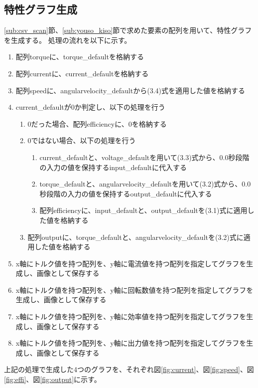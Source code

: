 \subsection{特性グラフ生成}\label{sub:toku_gurahu}
\ref{sub:csv_scan}節、\ref{sub:youso_kiso}節で求めた要素の配列を用いて、特性グラフを生成する。
処理の流れを以下に示す。
\begin{enumerate}
    \item 配列torqueに、torque\_defaultを格納する
    \item 配列currentに、current\_defaultを格納する
    \item 配列speedに、angularvelocity\_defaultから(3.4)式を適用した値を格納する
    \item current\_defaultが0か判定し、以下の処理を行う
    \begin{enumerate}
        \item 0だった場合、配列efficiencyに、0を格納する
        \item 0ではない場合、以下の処理を行う
        \begin{enumerate}
            \item current\_defaultと、voltage\_defaultを用いて(3.3)式から、0.0秒段階の入力の値を保持するinput\_defaultに代入する
            \item torque\_defaultと、angularvelocity\_defaultを用いて(3.2)式から、0.0秒段階の入力の値を保持するoutput\_defaultに代入する
            \item 配列efficiencyに、input\_defaultと、output\_defaultを(3.1)式に適用した値を格納する
        \end{enumerate}
    \item 配列outputに、torque\_defaultと、angularvelocity\_defaultを(3.2)式に適用した値を格納する
    \end{enumerate}
    \item x軸にトルク値を持つ配列を、y軸に電流値を持つ配列を指定してグラフを生成し、画像として保存する
    \item x軸にトルク値を持つ配列を、y軸に回転数値を持つ配列を指定してグラフを生成し、画像として保存する
    \item x軸にトルク値を持つ配列を、y軸に効率値を持つ配列を指定してグラフを生成し、画像として保存する
    \item x軸にトルク値を持つ配列を、y軸に出力値を持つ配列を指定してグラフを生成し、画像として保存する
\end{enumerate}
上記の処理で生成した4つのグラフを、それぞれ図\ref{fig:current}、図\ref{fig:speed}、図\ref{fig:effi}、図\ref{fig:output}に示す。
